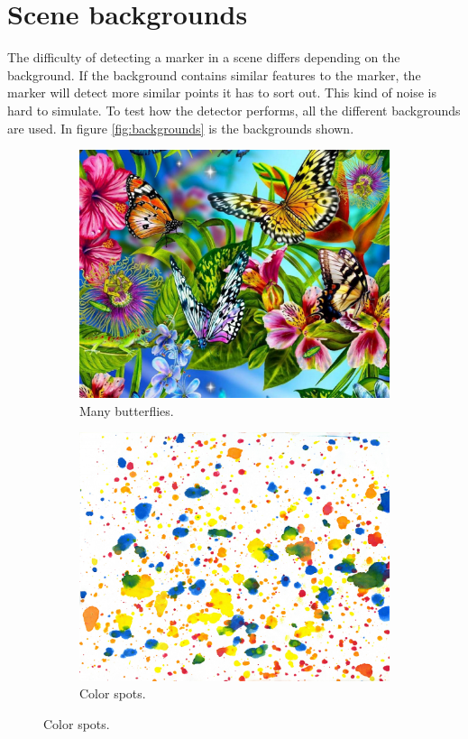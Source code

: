\section{Scene backgrounds}
\label{app:Scenes}

The difficulty of detecting a marker in a scene differs depending on the background.
If the background contains similar features to the marker, the marker will detect more similar points it has to sort out.
This kind of noise is hard to simulate.
To test how the detector performs, all the different backgrounds are used.
In figure \ref{fig:backgrounds} is the backgrounds shown.

\begin{figure}
\centering
  \begin{subfigure}{0.49\linewidth}    \includegraphics[width=\linewidth]{graphics/color1}   \caption{Many butterflies.} \label{fig:scene_m_but}  \end{subfigure}
  \begin{subfigure}{0.49\linewidth}    \includegraphics[width=\linewidth]{graphics/color2}   \caption{Color spots.}      \label{fig:scene_spots}  \end{subfigure}

\end{figure}
